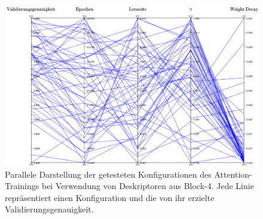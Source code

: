 \begin{figure}[h]
\includegraphics[scale=0.52]{NNOPT/Anhang/layer4_attention.pdf}
\caption{Parallele Darstellung der getesteten Konfigurationen des Attention-Trainings bei Verwendung von Deskriptoren aus \mbox{Block-4}. Jede Linie repräsentiert einen Konfiguration und die von ihr erzielte Validierungsgenauigkeit.}
\label{hyperopt_layer4_2}
\end{figure}
\newpage
